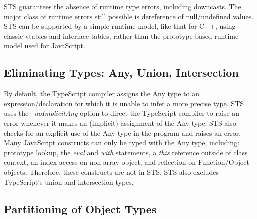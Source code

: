 STS guarantees the absence of runtime type errors, including downcasts.
The major class of runtime errors still possible is dereference of null/undefined values. 
STS can be supported by a simple runtime model, like that for C++, using classic vtables and interface tables,
rather than the prototype-based runtime model used for JavaScript.

\subsection{Eliminating Types: Any, Union, Intersection}

By default, the TypeScript compiler assigns the Any type to an expression/declaration for which it is unable to 
infer a more precise type. STS uses the \emph{--noImplicitAny} option to direct the TypeScript compiler to raise an error 
whenever it makes an (implicit) assignment of the Any type.  STS also checks for an explicit use of the Any type in
the program and raises an error. Many JavaScript constructs can only be typed with the Any type, including: prototype lookup,
the \emph{eval} and \emph{with} statements, a \emph{this} reference outside of class context, an index access on non-array object, and
reflection on Function/Object objects. Therefore, these constructs are not in STS.
STS also excludes TypeScript's union and intersection types.

\subsection{Partitioning of Object Types}

